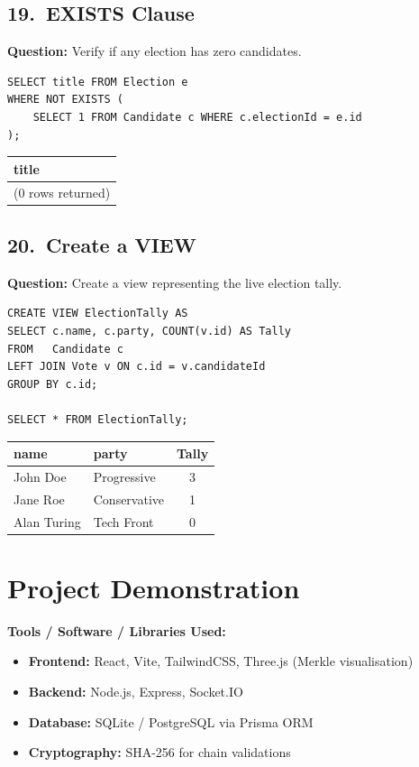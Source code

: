\documentclass[12pt, a4paper]{article}
\begin{document}
\subsection{19.\ EXISTS Clause}
\textbf{Question:} Verify if any election has zero candidates.
\begin{lstlisting}
SELECT title FROM Election e
WHERE NOT EXISTS (
    SELECT 1 FROM Candidate c WHERE c.electionId = e.id
);
\end{lstlisting}
\begin{center}
\begin{tabular}{|l|}
\hline
\textbf{title} \\ \hline
(0 rows returned) \\ \hline
\end{tabular}
\end{center}

\subsection{20.\ Create a VIEW}
\textbf{Question:} Create a view representing the live election tally.
\begin{lstlisting}
CREATE VIEW ElectionTally AS
SELECT c.name, c.party, COUNT(v.id) AS Tally
FROM   Candidate c
LEFT JOIN Vote v ON c.id = v.candidateId
GROUP BY c.id;

SELECT * FROM ElectionTally;
\end{lstlisting}
\begin{center}
\begin{tabular}{|l|l|c|}
\hline
\textbf{name} & \textbf{party} & \textbf{Tally} \\ \hline
John Doe    & Progressive  & 3 \\
Jane Roe    & Conservative & 1 \\
Alan Turing & Tech Front   & 0 \\ \hline
\end{tabular}
\end{center}

\section{Project Demonstration}

\textbf{Tools / Software / Libraries Used:}
\begin{itemize}
    \item \textbf{Frontend:} React, Vite, TailwindCSS, Three.js (Merkle visualisation)
    \item \textbf{Backend:} Node.js, Express, Socket.IO
    \item \textbf{Database:} SQLite / PostgreSQL via Prisma ORM
    \item \textbf{Cryptography:} SHA-256 for chain validations
\end{itemize}
\end{document}
